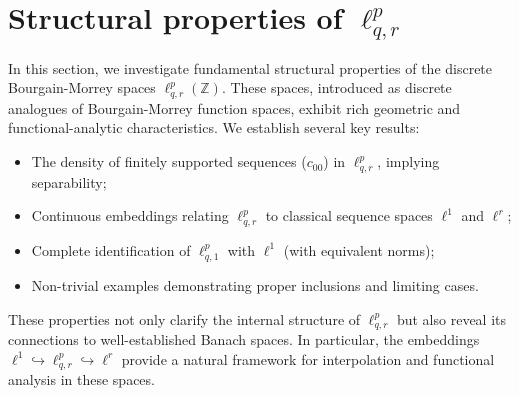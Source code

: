 \documentclass[preprint,12pt]{elsarticle}
\begin{document}
\section{Structural properties of $\ell^{p}_{q,r}$}
\label{sec:properties}

In this section, we investigate fundamental structural properties of the discrete Bourgain-Morrey spaces $\ell^{p}_{q,r}(\mathbb{Z})$. These spaces, introduced as discrete analogues of Bourgain-Morrey function spaces, exhibit rich geometric and functional-analytic characteristics. We establish several key results:
\begin{itemize}
    \item The density of finitely supported sequences ($c_{00}$) in $\ell^{p}_{q,r}$, implying separability;
    \item Continuous embeddings relating $\ell^{p}_{q,r}$ to classical sequence spaces $\ell^1$ and $\ell^r$;
    \item Complete identification of $\ell^{p}_{q,1}$ with $\ell^1$ (with equivalent norms);
    \item Non-trivial examples demonstrating proper inclusions and limiting cases.
\end{itemize}
These properties not only clarify the internal structure of $\ell^{p}_{q,r}$ but also reveal its connections to well-established Banach spaces. In particular, the embeddings $\ell^1 \hookrightarrow \ell^{p}_{q,r} \hookrightarrow \ell^r$ provide a natural framework for interpolation and functional analysis in these spaces.\\
\end{document}

